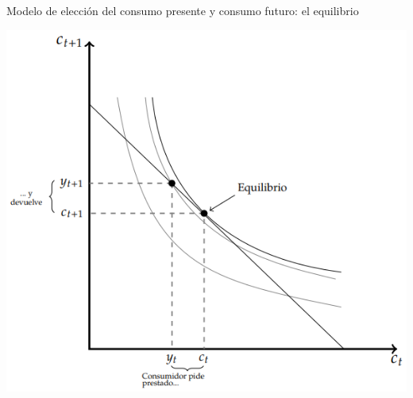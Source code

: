 \documentclass{beamer}
\begin{document}
\begin{frame}{Modelo de elección del consumo presente y consumo futuro: el equilibrio}
    \begin{center}
        \includegraphics[scale=0.65]{../Figures/C35.6.png}
    \end{center}  
\end{frame}
\end{document}
